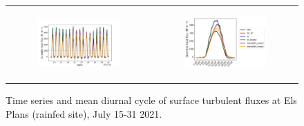 \begin{figure}[hbtp]
\begin{tabular}{cc}
        \begin{subfigure}[t]{0.5\textwidth}
            \caption{}
            \includegraphics[width=\textwidth]{images/chap5/time_series_elsplans_sens.png}
        \end{subfigure} &
        \begin{subfigure}[t]{0.5\textwidth}
            \caption{}
            \includegraphics[width=\textwidth]{images/chap5/diurnal_cycle_elsplans_sens.png}
        \end{subfigure} \\
    \end{tabular}
    \caption{Time series and mean diurnal cycle of surface turbulent fluxes at Els Plans (rainfed site), July 15-31 2021.}
\end{figure}



